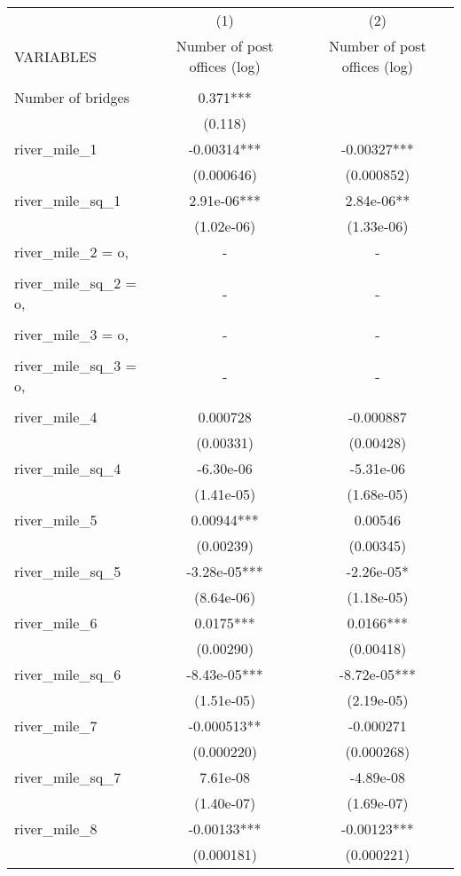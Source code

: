 \begin{tabular}{lcc} \hline
 & (1) & (2) \\
VARIABLES & Number of post offices (log) & Number of post offices (log) \\ \hline
 &  &  \\
Number of bridges & 0.371*** &  \\
 & (0.118) &  \\
river\_mile\_1 & -0.00314*** & -0.00327*** \\
 & (0.000646) & (0.000852) \\
river\_mile\_sq\_1 & 2.91e-06*** & 2.84e-06** \\
 & (1.02e-06) & (1.33e-06) \\
river\_mile\_2 = o, & - & - \\
 &  &  \\
river\_mile\_sq\_2 = o, & - & - \\
 &  &  \\
river\_mile\_3 = o, & - & - \\
 &  &  \\
river\_mile\_sq\_3 = o, & - & - \\
 &  &  \\
river\_mile\_4 & 0.000728 & -0.000887 \\
 & (0.00331) & (0.00428) \\
river\_mile\_sq\_4 & -6.30e-06 & -5.31e-06 \\
 & (1.41e-05) & (1.68e-05) \\
river\_mile\_5 & 0.00944*** & 0.00546 \\
 & (0.00239) & (0.00345) \\
river\_mile\_sq\_5 & -3.28e-05*** & -2.26e-05* \\
 & (8.64e-06) & (1.18e-05) \\
river\_mile\_6 & 0.0175*** & 0.0166*** \\
 & (0.00290) & (0.00418) \\
river\_mile\_sq\_6 & -8.43e-05*** & -8.72e-05*** \\
 & (1.51e-05) & (2.19e-05) \\
river\_mile\_7 & -0.000513** & -0.000271 \\
 & (0.000220) & (0.000268) \\
river\_mile\_sq\_7 & 7.61e-08 & -4.89e-08 \\
 & (1.40e-07) & (1.69e-07) \\
river\_mile\_8 & -0.00133*** & -0.00123*** \\
 & (0.000181) & (0.000221) \\

\end{tabular}
